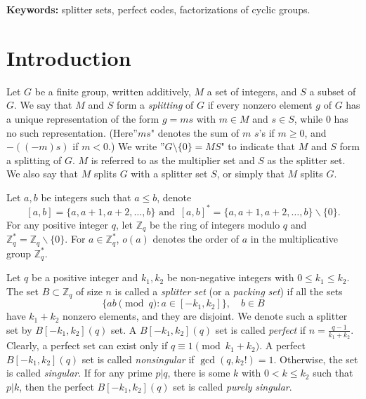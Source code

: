 \documentclass[12pt]{article}
\newtheorem{open problem}{Open problem}[section]
\begin{document}
{\bf Keywords:}
splitter sets, perfect codes, factorizations of cyclic groups.











\section{Introduction}

Let $G$ be a finite group, written additively, $M$ a set of integers, and $S$ a subset of $G$.
We  say that $M$ and $S$ form a \textsl{splitting} of $G$ if every nonzero element $g$ of $G$ has a unique representation of the form $g=ms$ with $m\in M$ and $s\in S$, while $0$ has no such representation.
(Here''$ms$" denotes the sum of $m$ $s$'s if $m\geq 0$, and $-((-m)s)$ if $m<0$.)
We  write ''$G\setminus \{0\}=MS$" to indicate that $M$ and $S$ form a splitting of $G$.
$M$  is referred to as the multiplier set and $S$ as the splitter set.
We  also say that $M$ splits $G$ with  a splitter set $S$, or simply that $M$ splits $G$.





 Let $a, b$ be integers such that $a\le b$, denote
$$[a, b] = \{a, a + 1, a + 2, \ldots , b\}\,\, \mbox{and}\,\,\,
[a, b]^\ast = \{a, a + 1, a + 2, \ldots, b\}\backslash\{0\}.$$
For any positive integer $q$, let $\mathbb{Z}_q$ be the ring of integers
modulo $q$ and $\mathbb{Z}_q ^\ast= \mathbb{Z}_q \backslash \{0\}$. For $a\in\mathbb{Z}_q ^\ast$, $o(a)$ denotes the order of $a$ in the multiplicative group $\mathbb{Z}_q ^\ast$.

Let $q$ be a positive integer and $k_1, k_2$ be non-negative
integers with $0\le  k_1\le  k_2$. The set $B\subset\mathbb{Z}_q$ of size $n$ is
called a {\it splitter} {\it set} (or a {\it packing} {\it set}) if all the sets
$$\{ab\pmod{q}: a\in [-k_1, k_2]\},\quad  b\in B $$
have $k_1+k_2$ nonzero elements, and they are disjoint. We denote
such a splitter set by $B[-k_1, k_2](q)$ set.
A $B[-k_1, k_2](q)$ set is called {\it perfect} if $n = \frac{q- 1}{k_1 + k_2}$. Clearly,
a perfect set can exist only if $q\equiv1\pmod{ k_1 + k_2}$.   A perfect $B[-k_1, k_2](q)$ set
is called {\it nonsingular} if $\gcd(q, k_2!) = 1$. Otherwise, the set is called
{\it singular}. If for any prime $p|q$, there is some $k$ with $0 < k \le k_2$
such that $p|k$, then the perfect $B[-k_1, k_2](q)$ set is called {\it
purely} {\it singular}.
\end{document}
